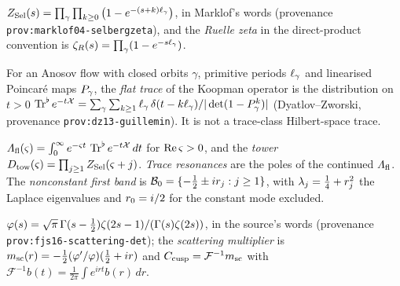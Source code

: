 \begin{definition}
\label{def:selberg-zeta}
$Z_{\mathrm{Sel}}(s) = \prod_\gamma\prod_{k\ge0}\big(1-e^{-(s+k)\ell_\gamma}\big)$, in
Marklof's words \texttt{} (provenance \texttt{prov:marklof04-selbergzeta}), and the
\emph{Ruelle zeta} in the direct-product convention is $\zeta_{R}(s) =
\prod_\gamma(1-e^{-s\ell_\gamma})$.
\end{definition}

\begin{definition}
\label{def:flat-trace}
For an Anosov flow with closed orbits $\gamma$, primitive periods
$\ell_\gamma$ and linearised Poincar\'e maps $P_{\gamma}$, the \emph{flat trace}
of the Koopman operator is the distribution on $t>0$
$\operatorname{Tr}^{\flat} e^{-t\mathcal X} = \sum_\gamma\sum_{k\ge1}\ell_\gamma\,\delta(t-k\ell_\gamma)
/|\det(1-P_{\gamma}^k)|$ (Dyatlov--Zworski, provenance
\texttt{prov:dz13-guillemin}). It is not a trace-class Hilbert-space trace.
\end{definition}

\begin{definition}
\label{def:flat-tower}
$\varLambda_{\mathrm{fl}}(\varsigma) = \int_0^\infty e^{-\varsigma t}\,\operatorname{Tr}^{\flat} e^{-t\mathcal X}\,dt$ for
$\operatorname{Re}\varsigma>0$, and the \emph{tower} $D_{\mathrm{tow}}(\varsigma) =
\prod_{j\ge1}Z_{\mathrm{Sel}}(\varsigma+j)$. \emph{Trace resonances} are the poles of the
continued $\varLambda_{\mathrm{fl}}$. The \emph{nonconstant first band} is
$\mathcal B_0 = \{-\tfrac12\pm ir_{j} : j\ge1\}$, with $\lambda_{j} = \frac14 +
r_{j}^2$ the Laplace eigenvalues and $r_{0} = i/2$ for the constant mode
excluded.
\end{definition}

\begin{definition}
\label{def:scattering-determinant}
$\varphi(s) = \sqrt\pi\,\Gamma(s-\tfrac12)\zeta(2s-1)/(\Gamma(s)\zeta(2s))$,
in the source's words \texttt{} (provenance
\texttt{prov:fjs16-scattering-det}); the \emph{scattering multiplier} is
$m_{\mathrm{sc}}(r) = -\tfrac12(\varphi'/\varphi)(\tfrac12+ir)$ and
$C_{\mathrm{cusp}} = \mathcal F^{-1}m_{\mathrm{sc}}$ with $\mathcal F^{-1}b(t) =
\frac1{2\pi}\int e^{irt}b(r)\,dr$.
\end{definition}

